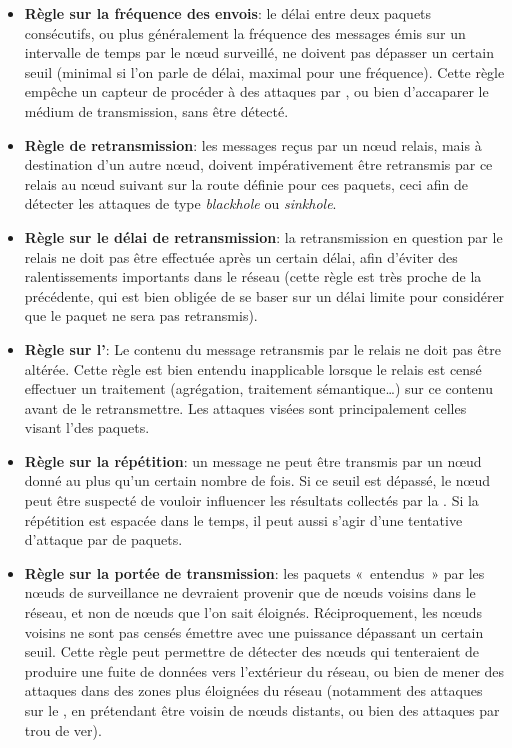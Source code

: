 \begin{itemize}
    \item \textbf{Règle sur la fréquence des envois}: le délai entre deux paquets consécutifs, ou plus généralement la fréquence des messages émis sur un intervalle de temps par le nœud surveillé, ne doivent pas dépasser un certain seuil (minimal si l'on parle de délai, maximal pour une fréquence). Cette règle empêche un capteur de procéder à des attaques par \deluge, ou bien d'accaparer le médium de transmission, sans être détecté.
    \item \textbf{Règle de retransmission}: les messages reçus par un nœud relais, mais à destination d'un autre nœud, doivent impérativement être retransmis par ce relais au nœud suivant sur la route définie pour ces paquets, ceci afin de détecter les attaques de type \textit{blackhole} ou \textit{sinkhole}.
    \item \textbf{Règle sur le délai de retransmission}: la retransmission en question par le relais ne doit pas être effectuée après un certain délai, afin d'éviter des ralentissements importants dans le réseau (cette règle est très proche de la précédente, qui est bien obligée de se baser sur un délai limite pour considérer que le paquet ne sera pas retransmis).
    \item \textbf{Règle sur l'\integrite}: Le contenu du message retransmis par le relais ne doit pas être altérée. Cette règle est bien entendu inapplicable lorsque le relais est censé effectuer un traitement (agrégation, traitement sémantique\dots) sur ce contenu avant de le retransmettre. Les attaques visées sont principalement celles visant l'\integrite des paquets.
    \item \textbf{Règle sur la répétition}: un message ne peut être transmis par un nœud donné au plus qu'un certain nombre de fois. Si ce seuil est dépassé, le nœud peut être suspecté de vouloir influencer les résultats collectés par la \sdb. Si la répétition est espacée dans le temps, il peut aussi s'agir d'une tentative d'attaque par  de paquets.
    \item \textbf{Règle sur la portée de transmission}: les paquets « entendus » par les nœuds de surveillance ne devraient provenir que de nœuds voisins dans le réseau, et non de nœuds que l'on sait éloignés. Réciproquement, les nœuds voisins ne sont pas censés émettre avec une puissance dépassant un certain seuil. Cette règle peut permettre de détecter des nœuds qui tenteraient de produire une fuite de données vers l'extérieur du réseau, ou bien de mener des attaques dans des zones plus éloignées du réseau (notamment des attaques sur le , en prétendant être voisin de nœuds distants, ou bien des attaques par trou de ver).

\end{itemize}
